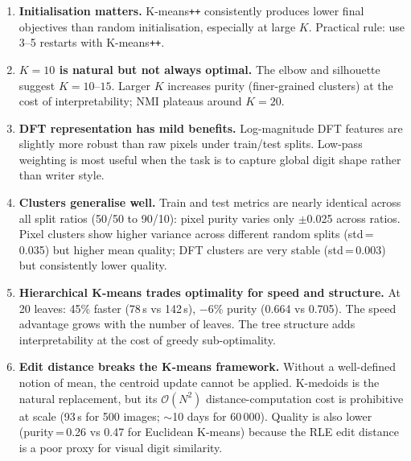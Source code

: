 \documentclass[11pt]{article}
\begin{document}
\begin{enumerate}[itemsep=4pt]
    \item \textbf{Initialisation matters.}
          K-means\texttt{++} consistently produces lower final objectives than
          random initialisation, especially at large $K$.
          Practical rule: use 3--5 restarts with K-means\texttt{++}.

    \item \textbf{$K{=}10$ is natural but not always optimal.}
          The elbow and silhouette suggest $K{=}10$--$15$.
          Larger $K$ increases purity (finer-grained clusters) at the cost of
          interpretability; NMI plateaus around $K{=}20$.

    \item \textbf{DFT representation has mild benefits.}
          Log-magnitude DFT features are slightly more robust than raw pixels
          under train/test splits. Low-pass weighting is most useful when the
          task is to capture global digit shape rather than writer style.

    \item \textbf{Clusters generalise well.}
          Train and test metrics are nearly identical across all split ratios
          (50/50 to 90/10): pixel purity varies only $\pm$0.025 across ratios.
          Pixel clusters show higher variance across different random splits
          (std\,=\,0.035) but higher mean quality; DFT clusters are very stable
          (std\,=\,0.003) but consistently lower quality.

    \item \textbf{Hierarchical K-means trades optimality for speed and structure.}
          At 20 leaves: 45\% faster (78\,s vs 142\,s), $-$6\% purity (0.664 vs 0.705).
          The speed advantage grows with the number of leaves.
          The tree structure adds interpretability at the cost of greedy sub-optimality.

    \item \textbf{Edit distance breaks the K-means framework.}
          Without a well-defined notion of mean, the centroid update cannot be
          applied. K-medoids is the natural replacement, but its $\mathcal{O}(N^2)$
          distance-computation cost is prohibitive at scale (93\,s for 500 images;
          $\sim$10 days for 60\,000). Quality is also lower (purity\,=\,0.26 vs
          0.47 for Euclidean K-means) because the RLE edit distance is a poor
          proxy for visual digit similarity.
\end{enumerate}
\end{document}
